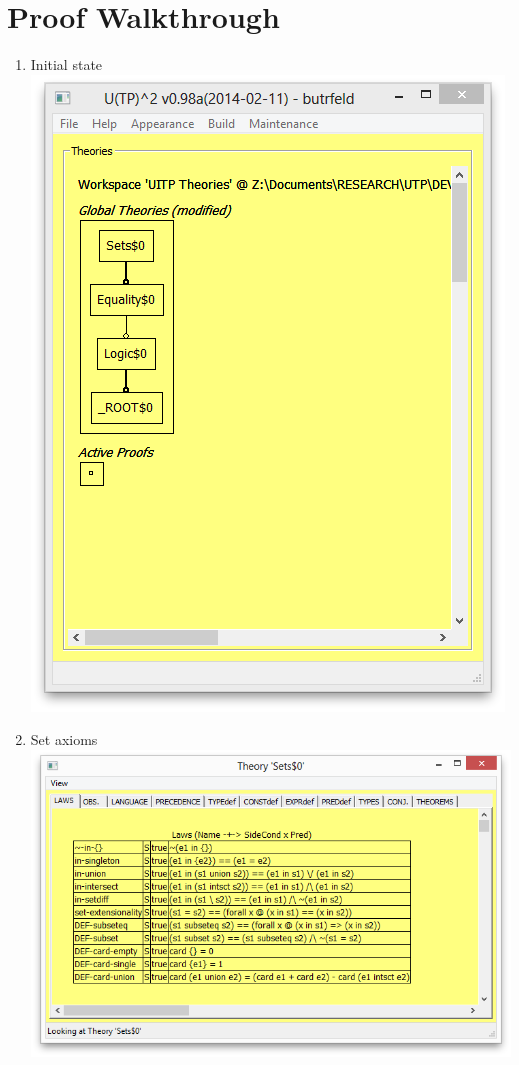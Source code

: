 \section{Proof Walkthrough}\label{sec:walkthrough}

\begin{enumerate}
  \item Initial state
  \\\includegraphics[scale=0.5]{SCREENSHOTS/01-initial-state.png}
  \item Set axioms
  \\\includegraphics[scale=0.5]{SCREENSHOTS/02-set-axioms.png}

\end{enumerate}
